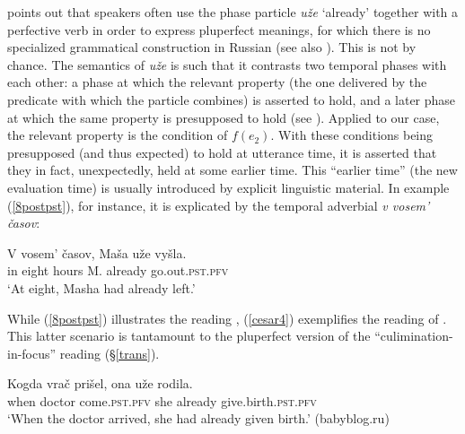 \documentclass[output=paper,colorlinks,citecolor=brown]{langscibook}
\begin{document}
\citet{Comrie1997} points out that speakers often use the phase particle \textit{uže} `already' together with a perfective verb in order to express pluperfect meanings, for which there is no specialized grammatical construction in Russian (see also \citealt[309]{Paslawska.Stechow2003}). This is not by chance.
The semantics of \textit{uže} is such that it contrasts two temporal phases with each other: a phase at which the relevant property
(the one delivered by the predicate with which the particle combines)
is asserted to hold, and a later phase at which the same property is presupposed to hold (see \citealt{Ippolito2007}).
Applied to our case, the relevant property is the condition of $f(e_2)$. 
With these conditions being presupposed (and thus expected) to hold at utterance time, it is asserted that they in fact, unexpectedly, 
held at some earlier time. 
This ``earlier time'' (the new evaluation time) is usually introduced by explicit linguistic material. In  example (\ref{8postpst}), for instance, it is explicated by the temporal adverbial \textit{v vosem' časov}:

\newpage
\ea\label{8postpst}
\gll V vosem' časov, Maša uže vyšla.  \\
in eight hours M. already go.out.\textsc{pst.pfv} \\
\glt `At eight, Masha had already left.'
\z


\noindent While (\ref{8postpst}) illustrates the reading , (\ref{cesar4}) exemplifies 
the reading  of . This latter scenario is tantamount to the pluperfect version of the ``culimination-in-focus'' reading (\S \ref{trans}).

\ea\label{cesar4}
\gll Kogda vrač
prišel, ona uže
rodila. \\
when doctor come.\textsc{pst.pfv} 
she already give.birth.\textsc{pst.pfv} \\
\glt `When the doctor arrived, she had already given birth.' \hfill (babyblog.ru)
\z 
\end{document}
